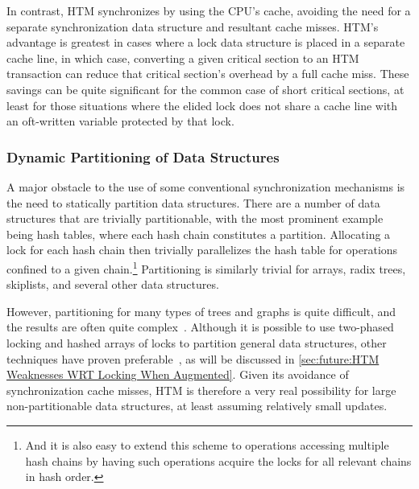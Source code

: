 In contrast, HTM synchronizes by using the CPU's cache, avoiding the need
for a separate synchronization data structure and resultant cache misses.
HTM's advantage is greatest in cases where a lock data structure is
placed in a separate cache line, in which case, converting a given
critical section to an HTM transaction can reduce that critical section's
overhead by a full cache miss.
These savings can be quite significant for the common case of short
critical sections, at least for those situations where the elided lock
does not share a cache line with an oft-written variable protected by
that lock.

\QuickQuizEnd

\subsubsection{Dynamic Partitioning of Data Structures}
\label{sec:future:Dynamic Partitioning of Data Structures}

A major obstacle to the use of some conventional synchronization mechanisms
is the need to statically partition data structures.
There are a number of data structures that are trivially
partitionable, with the most prominent example being hash tables,
where each hash chain constitutes a partition.
Allocating a lock for each hash chain then trivially parallelizes
the hash table for operations confined to a given chain.\footnote{
	And it is also easy to extend this scheme to operations accessing
	multiple hash chains by having such operations acquire the
	locks for all relevant chains in hash order.}
Partitioning is similarly trivial for arrays, radix trees, skiplists, and
several other data structures.

However, partitioning for many types of trees and graphs is quite
difficult, and the results are often quite complex~\cite{Ellis80}.
Although it is possible to use two-phased locking and hashed arrays
of locks to partition general data structures, other techniques
have proven preferable~\cite{DavidSMiller2006HashedLocking},
as will be discussed in
\cref{sec:future:HTM Weaknesses WRT Locking When Augmented}.
Given its avoidance of synchronization cache misses,
HTM is therefore a very real possibility for large non-partitionable
data structures, at least assuming relatively small updates.

